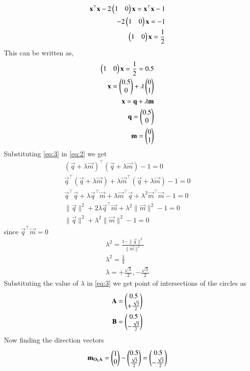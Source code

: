 \documentclass[journal,12pt,twocolumn]{IEEEtran}
\begin{document}
\begin{enumerate}
\begin{align}
 \Vec{x}^\top\Vec{x} - 2 \myvec{1&0}\Vec{x} = \Vec{x}^\top\Vec{x} -1\\
- 2 \myvec{1&0}\Vec{x} = -1\\
\myvec{1&0}\Vec{x} = \frac{1}{2}
\end{align}
This can be written as,
\begin{align}
    \myvec{1&0}\Vec{x} = \frac{1}{2}=0.5\\
   \vec{x}=\myvec{0.5\\0}+\lambda\myvec{0\\1} \\
    \vec{x}=\vec{q}+\lambda\vec{m} \label{eq:3}\\
   \vec{q}=\myvec{0.5\\0}\\
   \vec{m}=\myvec{0\\1}
\end{align}
Substituting \eqref{eq:3} in \eqref{eq:2} we get
\begin{align}
 (\vec{q}+\lambda\vec{m})^\top (\vec{q}+\lambda\vec{m})-1=0\\
 \vec{q}^\top(\vec{q}+\lambda\vec{m})+\lambda\vec{m}^\top(\vec{q}+\lambda\vec{m})-1=0\\
 \vec{q}^\top\vec{q} +  \lambda\vec{q}^\top\vec{m} + \lambda\vec{m}^\top\vec{q} +  \lambda^2\vec{m}^\top\vec{m} -1=0\\
 \|\vec{q}\|^2 + 2\lambda\vec{q}^\top\vec{m} + \lambda^2\|\vec{m}\|^2 -1=0\\
  \|\vec{q}\|^2 + \lambda^2\|\vec{m}\|^2 -1=0 
\end{align}
 since $ \vec{q}^\top\vec{m}=0 $
\begin{align}
  \lambda^2= \frac{1- \|\vec{q}\|^2}{\|\vec{m}\|^2}\\
  \lambda^2=\frac{3}{4}\\
    \lambda= +\frac{\sqrt{3}}{2},-\frac{\sqrt{3}}{2}
\end{align}
Substituting the value of $\lambda$ in \eqref{eq:3} we get point of intersections of  the circles as
\begin{align}
   \mathbf{A}= \begin{pmatrix}0.5\\+\frac{\sqrt{3}}{2}\end{pmatrix}\\
\mathbf{B}= \begin{pmatrix}0.5\\-\frac{\sqrt{3}}{2}\end{pmatrix}
\end{align}
Now finding the direction vectors
\begin{align}
    \vec{m_{O_1A}}=\myvec{1\\0}-\myvec{0.5\\\frac{\sqrt{3}}{2}}=\myvec{0.5\\-\frac{\sqrt{3}}{2}}\\

\end{align}
\end{enumerate}
\end{document}

